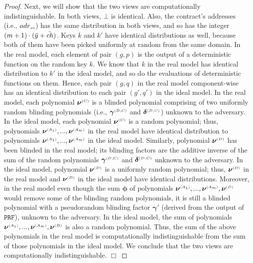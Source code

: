 \begin{proof}
 Next, we will show that the two views are computationally indistinguishable. In both views, $\bot$ is identical. Also, the contract’s addresses (i.e., ${adr}_{\scriptscriptstyle sc}$) has the same
distribution in both views, and so has the integer $(m+1)\cdot(\ddot{y}+\ddot{ch})$. Keys $k$ and $  k'$ have identical distributions as well, because both of them have been picked uniformly at random from the same domain.  In the real model, each element of pair $(g, p)$ is the output of a deterministic function on the random key $k$. We know that $k$ in the real model has identical distribution to $  k'$ in the ideal model, and so do the evaluations of deterministic functions on them. Hence, each pair $(g, q)$ in the real model component-wise has an identical distribution to each pair $(g', q')$ in the ideal model. In the real model, each polynomial  $\bm\nu^{\scriptscriptstyle (C)}$ is a blinded polynomial comprising of two uniformly random blinding polynomials (i.e., $\bm\gamma^{ \scriptscriptstyle {  {(D,C)}}}$ and $\bm\delta^{ \scriptscriptstyle {  {(D,C)}}}$) unknown to the adversary. In the ideal model, each polynomial  $ {\bm\nu}^{\scriptscriptstyle (C)}$ is a random polynomial; thus, polynomials $\bm\nu^{\scriptscriptstyle (A_1)},..., \bm\nu^{\scriptscriptstyle (A_m)}$ in the real model have identical distribution to  polynomials $ {\bm\nu}^{\scriptscriptstyle (A_1)}, ...,  {\bm\nu}^{\scriptscriptstyle (A_m)}$ in the ideal model.  Similarly,  polynomial $\bm\nu^{\scriptscriptstyle (D)}$ has been blinded in the real model; its blinding factors are the additive inverse of  the sum of the random polynomials $\bm\gamma^{ \scriptscriptstyle {  {(D,C)}}}$ and $\bm\delta^{ \scriptscriptstyle {  {(D,C)}}}$ unknown to the adversary. In the ideal model, polynomial $ {\bm\nu}^{\scriptscriptstyle (D)}$ is a uniformly random polynomial; thus, ${\bm\nu}^{\scriptscriptstyle (D)}$ in the real model and $ {\bm\nu}^{\scriptscriptstyle (D)}$ in the ideal model have identical distributions.
Moreover, in the real model even though the sum $\bm\phi$ of polynomials  $\bm\nu^{\scriptscriptstyle (A_1)},..., \bm\nu^{\scriptscriptstyle (A_m)}, \bm\nu^{\scriptscriptstyle (D)}$ would remove some of the blinding random polynomials, it is still a blinded polynomial with a pseudorandom blinding factor $\bm\gamma'$ (derived from the output of $\mathtt{PRF}$), unknown to the adversary. In the ideal model, the sum of polynomials $ {\bm\nu}^{\scriptscriptstyle (A_1)}, ...,  {\bm\nu}^{\scriptscriptstyle (A_m)},  {\bm\nu}^{\scriptscriptstyle (D)}$ is also a random polynomial. Thus, the sum of the above polynomials in the real model is computationally indistinguishable from the sum of those polynomials in the ideal model. We conclude that the two views are computationally indistinguishable. 
  \hfill\(\Box\)\end{proof}
















